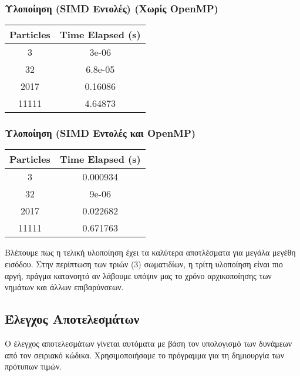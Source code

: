 \documentclass[11pt]{scrartcl} %
\begin{document}
\subsubsection{ Υλοποίηση (SIMD Εντολές) (Χωρίς OpenMP)}

\begin{table}[H]
    \centering
    \begin{tabular}{|c|c|}
    \hline
        \textbf{Particles} & \textbf{Time Elapsed (s)} \\ \hline
            3     & 3e-06    \\ \hline
            32    & 6.8e-05  \\ \hline
            2017  & 0.16086  \\ \hline
            11111 & 4.64873  \\ \hline
    \end{tabular}
\end{table}

\subsubsection{ Υλοποίηση (SIMD Εντολές και OpenMP)}

\begin{table}[H]
    \centering
    \begin{tabular}{|c|c|}
    \hline
        \textbf{Particles} & \textbf{Time Elapsed (s)} \\ \hline
            3     & 0.000934 \\ \hline
            32    & 9e-06    \\ \hline
            2017  & 0.022682 \\ \hline
            11111 & 0.671763 \\ \hline
    \end{tabular}
\end{table}

Βλέπουμε πως η τελική υλοποίηση έχει τα καλύτερα αποτλέσματα για μεγάλα μεγέθη εισόδου.
Στην περίπτωση των τριών (3) σωματιδίων, η τρίτη υλοποίηση είναι πιο αργή, πράγμα κατανοητό αν λάβουμε υπόψιν μας το χρόνο αρχικοποίησης των νημάτων και άλλων επιβαρύνσεων.

\subsection{Έλεγχος Αποτελεσμάτων}

Ο έλεγχος αποτελεσμάτων γίνεται αυτόματα με βάση τον υπολογισμό των δυνάμεων από τον σειριακό κώδικα.
Χρησιμοποιήσαμε το πρόγραμμα  για τη δημιουργία των πρότυπων τιμών.

{\ttfamily

}

% 
\end{document}
